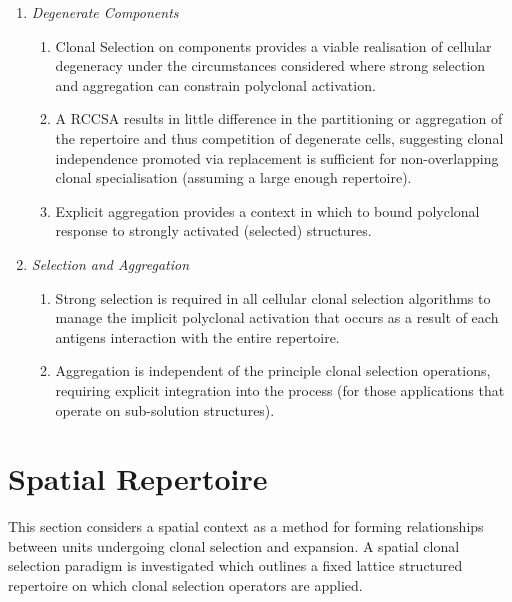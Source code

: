 \begin{enumerate}
	\item \emph{Degenerate Components}
	\begin{enumerate}
		\item Clonal Selection on components provides a viable realisation of cellular degeneracy under the circumstances considered where strong selection and aggregation can constrain polyclonal activation.
		\item A RCCSA results in little difference in the partitioning or aggregation of the repertoire and thus competition of degenerate cells, suggesting clonal independence promoted via replacement is sufficient for non-overlapping clonal specialisation (assuming a large enough repertoire).
		\item Explicit aggregation provides a context in which to bound polyclonal response to strongly activated (selected) structures.
	\end{enumerate}
	
	\item \emph{Selection and Aggregation}
	\begin{enumerate}
		\item Strong selection is required in all cellular clonal selection algorithms to manage the implicit polyclonal activation that occurs as a result of each antigens interaction with the entire repertoire.
		\item Aggregation is independent of the principle clonal selection operations, requiring explicit integration into the process (for those applications that operate on sub-solution structures).
	\end{enumerate}
	
\end{enumerate}


%
%
\section{Spatial Repertoire}
\label{sec:cells:spatial}
This section considers a spatial context as a method for forming relationships between units undergoing clonal selection and expansion. A spatial clonal selection paradigm is investigated which outlines a fixed lattice structured repertoire on which clonal selection operators are applied. 

%
%
